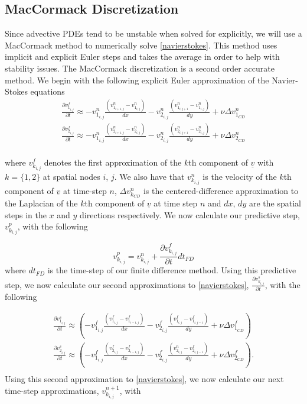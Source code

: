 \documentclass[a4paper]{article}
\theoremstyle{remark}
\theoremstyle{remark}
\begin{document}
\subsection{MacCormack Discretization} \label{MacCormack Section}
Since advective PDEs tend to be unstable when solved for explicitly, we will use a MacCormack method to numerically solve \eqref{navierstokes}. This method uses implicit and explicit Euler steps and takes the average in order to help with stability issues. The MacCormack discretization is a second order accurate method. We begin with the following explicit Euler approximation of the Navier-Stokes equations
\begin{eqnarray}
\frac{\partial v^{f}_{1_{i,j}}}{\partial t} \approx-v^{n}_{1_{i,j}}\frac{\left(v^{n}_{1_{i+1,j}}-v^{n}_{1_{i,j}}\right)}{dx}-v^{n}_{2_{i,j}}\frac{\left(v^{n}_{1_{i,j+1}}-v^{n}_{1_{i,j}}\right)}{dy}+\nu\Delta v^{n}_{1_{CD}}\\
\nonumber
\frac{\partial v^{f}_{2_{i,j}}}{\partial t} \approx -v^{n}_{1_{i,j}}\frac{\left(v^{n}_{2_{i+1,j}}-v^{n}_{2_{i,j}}\right)}{dx}-v^{n}_{2_{i,j}}\frac{\left(v^{n}_{2_{i,j+1}}-v^{n}_{2_{i,j}}\right)}{dy}+\nu\Delta v^{n}_{2_{CD}}\\
\nonumber
\end{eqnarray}

\noindent where $v^{f}_{k_{i,j}}$ denotes the first approximation of the $k$th component of $\underline{v}$ with $k=\{1,2\}$ at spatial nodes $i$, $j$. We also have that $v^{n}_{k_{i,j}}$ is the velocity of the $k$th component of $\underline{v}$ at time-step $n$, $\Delta v^{n}_{k_{CD}}$ is the centered-difference approximation to the Laplacian of the $k$th component of $\underline{v}$ at time step $n$ and $dx$, $dy$ are the spatial steps in the $x$ and $y$ directions respectively. We now calculate our predictive step, $v^{p}_{k_{i,j}}$, with the following


\begin{equation}\label{predictive}
v^{p}_{k_{i,j}}=v^{n}_{k_{i,j}}+\frac{\partial v^{f}_{k_{i,j}}}{\partial t}dt_{FD}
\end{equation}
where $dt_{FD}$ is the time-step of our finite difference method. Using this predictive step, we now calculate our second approximations to \eqref{navierstokes}, $\frac{\partial v^{s}_{k_{i,j}}}{\partial t}$, with the following

\begin{eqnarray}
\frac{\partial v^{s}_{1_{i,j}}}{\partial t} \approx \left(-v^{f}_{1_{i,j}}\frac{\left(v^{f}_{1_{i,j}}-v^{f}_{1_{i-1,j}}\right)}{dx}-v^{f}_{2_{i,j}}\frac{\left(v^{f}_{1_{i,j}}-v^{f}_{1_{i,j-1}}\right)}{dy}+\nu\Delta v^{f}_{1_{CD}}\right)\\
\nonumber
\frac{\partial v^{s}_{2_{i,j}}}{\partial t} \approx \left(-v^{f}_{1_{i,j}}\frac{\left(v^{f}_{2_{i,j}}-v^{f}_{2_{i-1,j}}\right)}{dx}-v^{f}_{2_{i,j}}\frac{\left(v^{n}_{2_{i,j}}-v^{f}_{2_{i,j-1}}\right)}{dy}+\nu\Delta v^{f}_{2_{CD}}\right).\\
\nonumber
\end{eqnarray}
Using this second approximation to \eqref{navierstokes}, we now calculate our next time-step approximations, $v^{n+1}_{k_{i,j}}$, with
\end{document}
